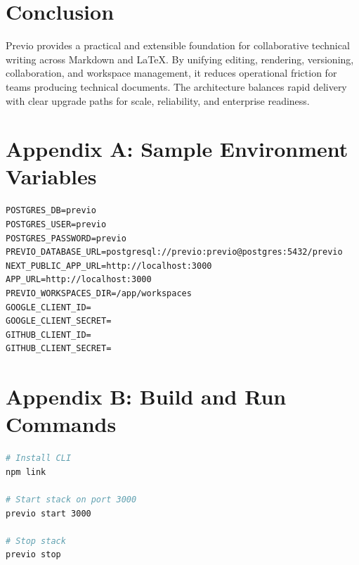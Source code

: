 \documentclass[11pt,a4paper]{article}
\begin{document}
\section{Conclusion}
Previo provides a practical and extensible foundation for collaborative technical writing across Markdown and LaTeX. By unifying editing, rendering, versioning, collaboration, and workspace management, it reduces operational friction for teams producing technical documents. The architecture balances rapid delivery with clear upgrade paths for scale, reliability, and enterprise readiness.

\section*{Appendix A: Sample Environment Variables}
\begin{lstlisting}[style=previo]
POSTGRES_DB=previo
POSTGRES_USER=previo
POSTGRES_PASSWORD=previo
PREVIO_DATABASE_URL=postgresql://previo:previo@postgres:5432/previo
NEXT_PUBLIC_APP_URL=http://localhost:3000
APP_URL=http://localhost:3000
PREVIO_WORKSPACES_DIR=/app/workspaces
GOOGLE_CLIENT_ID=
GOOGLE_CLIENT_SECRET=
GITHUB_CLIENT_ID=
GITHUB_CLIENT_SECRET=
\end{lstlisting}

\section*{Appendix B: Build and Run Commands}
\begin{lstlisting}[style=previo,language=bash]
# Install CLI
npm link

# Start stack on port 3000
previo start 3000

# Stop stack
previo stop
\end{lstlisting}
\end{document}
